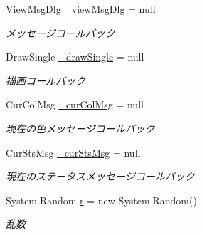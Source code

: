 \begin{DoxyCompactItemize}
View\+Msg\+Dlg \hyperlink{class_reversi_form_1_1_reversi_play_a25e4a5bb65bacf2af7d4f0ae3bfabf3d}{\+\_\+view\+Msg\+Dlg} = null
\begin{DoxyCompactList}\small\item\em メッセージコールバック \end{DoxyCompactList}\item 
\mbox{\label{class_reversi_form_1_1_reversi_play_a8f59694189617e4219f51a755f522d20}} 
Draw\+Single \hyperlink{class_reversi_form_1_1_reversi_play_a8f59694189617e4219f51a755f522d20}{\+\_\+draw\+Single} = null
\begin{DoxyCompactList}\small\item\em 描画コールバック \end{DoxyCompactList}\item 
\mbox{\label{class_reversi_form_1_1_reversi_play_aa980069de30bee78de7394279e573a7d}} 
Cur\+Col\+Msg \hyperlink{class_reversi_form_1_1_reversi_play_aa980069de30bee78de7394279e573a7d}{\+\_\+cur\+Col\+Msg} = null
\begin{DoxyCompactList}\small\item\em 現在の色メッセージコールバック \end{DoxyCompactList}\item 
\mbox{\label{class_reversi_form_1_1_reversi_play_a4fc70df19334fd36e75a4f492d7914d9}} 
Cur\+Sts\+Msg \hyperlink{class_reversi_form_1_1_reversi_play_a4fc70df19334fd36e75a4f492d7914d9}{\+\_\+cur\+Sts\+Msg} = null
\begin{DoxyCompactList}\small\item\em 現在のステータスメッセージコールバック \end{DoxyCompactList}\item 
\mbox{\label{class_reversi_form_1_1_reversi_play_ace9bbe255131eb620f372b7c5afb2b8b}} 
System.\+Random \hyperlink{class_reversi_form_1_1_reversi_play_ace9bbe255131eb620f372b7c5afb2b8b}{r} = new System.\+Random()
\begin{DoxyCompactList}\small\item\em 乱数 \end{DoxyCompactList}\end{DoxyCompactItemize}


